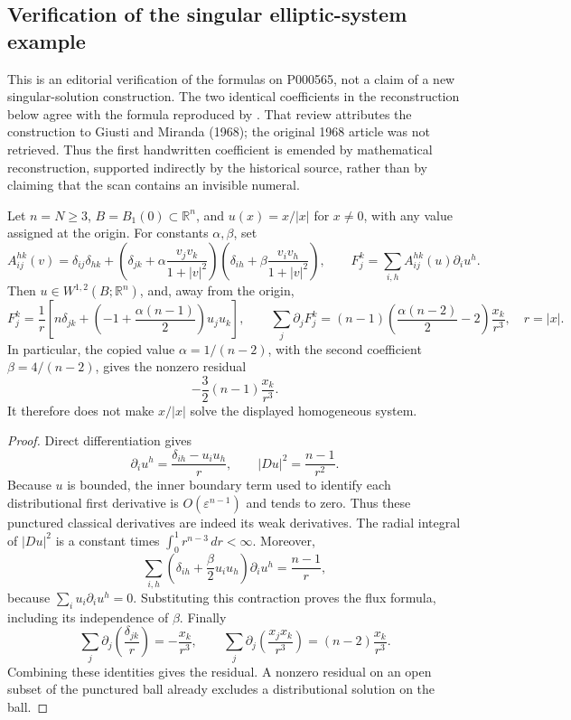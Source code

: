 \subsection{Verification of the singular elliptic-system example}

This is an editorial verification of the formulas on P000565, not a claim of a new singular-solution construction. The two identical coefficients in the reconstruction below agree with the formula reproduced by \citet[\S3.2, equation (3.3)]{mingione2006regularity}. That review attributes the construction to Giusti and Miranda (1968); the original 1968 article was not retrieved. Thus the first handwritten coefficient is emended by mathematical reconstruction, supported indirectly by the historical source, rather than by claiming that the scan contains an invisible numeral.

\begin{proposition}\ours
Let \(n=N\ge3\), \(B=B_1(0)\subset\mathbb R^n\), and \(u(x)=x/|x|\) for \(x\ne0\), with any value assigned at the origin. For constants \(\alpha,\beta\), set
\[
 A_{ij}^{hk}(v)=\delta_{ij}\delta_{hk}
 +\left(\delta_{jk}+\alpha\frac{v_jv_k}{1+|v|^2}\right)
  \left(\delta_{ih}+\beta\frac{v_iv_h}{1+|v|^2}\right),
 \qquad
 F_j^k=\sum_{i,h}A_{ij}^{hk}(u)\partial_i u^h.
\]
Then \(u\in W^{1,2}(B;\mathbb R^n)\), and, away from the origin,
\[
 F_j^k=\frac1r\left[n\delta_{jk}
       +\left(-1+\frac{\alpha(n-1)}2\right)u_ju_k\right],
 \qquad
 \sum_j\partial_jF_j^k
 =(n-1)\left(\frac{\alpha(n-2)}2-2\right)\frac{x_k}{r^3},
 \quad r=|x|.
\]
In particular, the copied value \(\alpha=1/(n-2)\), with the second coefficient \(\beta=4/(n-2)\), gives the nonzero residual
\[
 -\frac32(n-1)\frac{x_k}{r^3}.
\]
It therefore does not make \(x/|x|\) solve the displayed homogeneous system.
\end{proposition}
\begin{proof}
Direct differentiation gives
\[
 \partial_i u^h=\frac{\delta_{ih}-u_i u_h}{r},
 \qquad |Du|^2=\frac{n-1}{r^2}.
\]
Because \(u\) is bounded, the inner boundary term used to identify each distributional first derivative is \(O(\varepsilon^{n-1})\) and tends to zero. Thus these punctured classical derivatives are indeed its weak derivatives. The radial integral of \(|Du|^2\) is a constant times \(\int_0^1r^{n-3}\,dr<\infty\). Moreover,
\[
 \sum_{i,h}\left(\delta_{ih}+\frac\beta2u_i u_h\right)
                    \partial_i u^h=\frac{n-1}{r},
\]
because \(\sum_i u_i\partial_i u^h=0\). Substituting this contraction proves the flux formula, including its independence of \(\beta\). Finally
\[
 \sum_j\partial_j\!\left(\frac{\delta_{jk}}r\right)
 =-\frac{x_k}{r^3},\qquad
 \sum_j\partial_j\!\left(\frac{x_jx_k}{r^3}\right)
 =(n-2)\frac{x_k}{r^3}.
\]
Combining these identities gives the residual. A nonzero residual on an open subset of the punctured ball already excludes a distributional solution on the ball.
\end{proof}

